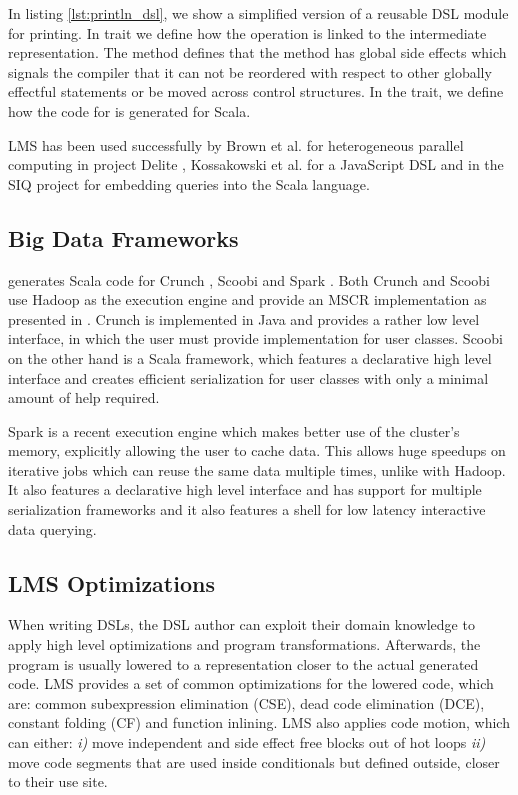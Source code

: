  
In listing \ref{lst:println_dsl}, we show a simplified version of a reusable DSL module for printing. In trait  we define how the  operation is linked to the intermediate representation. The  method defines that the  method has global side effects which signals the compiler that it can not be reordered with respect to other globally effectful statements or be moved across control structures. In the  trait, we define how the code for  is generated for Scala. 

LMS has been used successfully by Brown et al. for heterogeneous parallel computing in project Delite \cite{brown_heterogeneous_2011}, Kossakowski et al. for a JavaScript DSL \cite{greg} and in the SIQ project for embedding queries into the Scala language.
\subsection{Big Data Frameworks}
\label{subsed:big-data-frameworks}
\tool generates Scala code for Crunch \cite{crunch}, Scoobi \cite{scoobi} and Spark \cite{spark-nsdi}. Both Crunch and Scoobi use Hadoop as the execution engine and provide an MSCR implementation as presented in \cite{chambers_flumejava:_2010}. Crunch is implemented in Java and provides a rather low level interface, in which the user must provide implementation for user classes. Scoobi on the other hand is a Scala framework, which features a declarative high level interface and creates efficient serialization for user classes with only a minimal amount of help required. 

Spark is a recent execution engine which makes better use of the cluster's memory, explicitly allowing the user to cache data. This allows huge speedups on iterative jobs which can reuse the same data multiple times, unlike with Hadoop. It also features a declarative high level interface and has support for multiple serialization frameworks and it also features a shell for low latency interactive data querying.

\subsection{LMS Optimizations}
\label{subsec:lms-optimizations}
When writing DSLs, the DSL author can exploit their domain knowledge to apply high level optimizations and program transformations. Afterwards, the program is usually lowered to a representation closer to the actual generated code. LMS provides a set of common optimizations for the lowered code, which are: common subexpression elimination (CSE), dead code elimination (DCE), constant folding (CF) and function inlining. LMS also applies code motion, which can either: \emph{i)} move independent and side effect free blocks out of hot loops \emph{ii)} move code segments that are used inside conditionals but defined outside, closer to their use site.   

